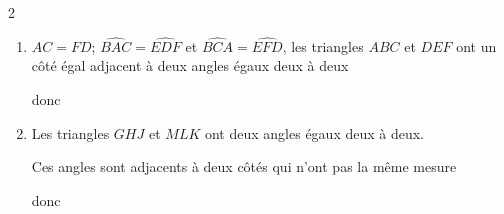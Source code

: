 \begin{corrige}
    \phantom{rrr}    
    \begin{multicols}2
        \begin{enumerate}
            \item $AC=FD$; $\widehat{BAC}=\widehat{EDF}$ et $\widehat{BCA}=\widehat{EFD}$, les triangles $ABC$ et $DEF$ ont
            un côté égal adjacent à deux angles égaux deux à deux
            
            donc 
            \columnbreak
            \item Les triangles $GHJ$ et $MLK$ ont deux angles égaux deux à deux.
            
            Ces angles sont adjacents à deux côtés qui n'ont pas la même mesure

            donc 
        \end{enumerate}
    \end{multicols}
\end{corrige}


